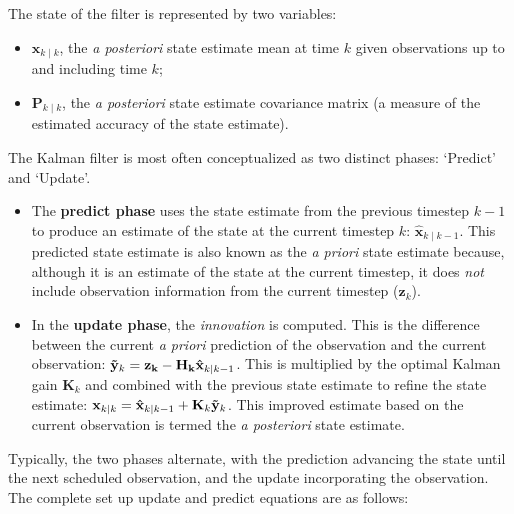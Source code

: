 \documentclass[12pt]{book}
\theoremstyle{definition}
\begin{document}
The state of the filter is represented by two variables:
\begin{itemize}
    \item $\mathbf{x}_{k\mid k}$, the \emph{a posteriori} state estimate mean at time $k$ given observations up to and including time $k$;
    \item $\mathbf{P}_{k\mid k}$, the \emph{a posteriori} state estimate covariance matrix (a measure of the estimated accuracy of the state estimate).

\end{itemize}

The Kalman filter  is most often conceptualized as two distinct phases: `Predict' and `Update'.

\begin{itemize}
    \item The \textbf{predict phase} uses the state estimate from the previous timestep \(k-1\) to produce an estimate of the state at the current timestep \(k\): $\mathbf{\hat{x}}_{k\mid k-1}$. This predicted state estimate is also known as the \emph{a priori} state estimate because, although it is an estimate of the state at the current timestep, it does \emph{not} include observation information from the current timestep ($\mathbf{z}_{k}$).
    \item In the \textbf{update phase}, the \emph{innovation} is computed. This is the difference between the current \emph{a priori} prediction of the observation and the current observation: \(\mathbf{\Tilde{y}}_k = \mathbf{z_k} - \mathbf{H_k}\mathbf{\hat{x}}_{k\mid k-1}\). This is multiplied by the optimal Kalman gain $\mathbf{K}_k$ and combined with the previous state estimate to refine the state estimate: $\mathbf{x}_{k\mid k} = \mathbf{\hat{x}}_{k\mid k-1} + \mathbf{K}_k \mathbf{\Tilde{y}}_k$. This improved estimate based on the current observation is termed the \emph{a posteriori} state estimate.
\end{itemize} 

Typically, the two phases alternate, with the prediction advancing the state until the next scheduled observation, and the update incorporating the observation. \\

The complete set up update and predict equations are as follows: \\
\end{document}
